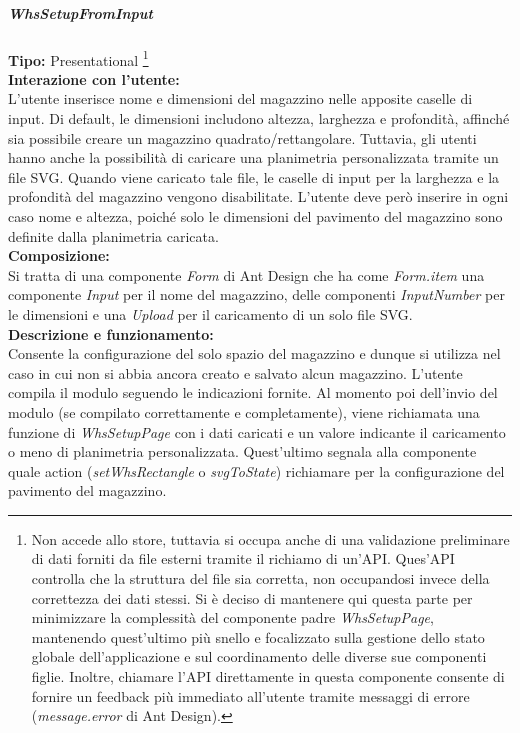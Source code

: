 \subparagraph{\colorbox{verde_uml}{WhsSetupFromInput}}
\textbf{Tipo:} Presentational \footnote[1]{\label{footnoteApi}Non accede allo store, tuttavia si occupa anche di una validazione preliminare di dati forniti da file esterni tramite il richiamo di un'API. Ques'API controlla che la struttura del file sia corretta, non occupandosi invece della correttezza dei dati stessi. Si è deciso di mantenere qui questa parte per minimizzare la complessità del componente padre \textit{WhsSetupPage}, mantenendo quest'ultimo più snello e focalizzato sulla gestione dello stato globale dell'applicazione e sul coordinamento delle diverse sue componenti figlie. Inoltre, chiamare l'API direttamente in questa componente consente di fornire un feedback più immediato all'utente tramite messaggi di errore (\textit{message.error} di Ant Design).} \\
\textbf{Interazione con l'utente:} \\
L'utente inserisce nome e dimensioni del magazzino nelle apposite caselle di input. Di default, le dimensioni includono altezza, larghezza e profondità, affinché sia possibile creare un magazzino quadrato/rettangolare. Tuttavia, gli utenti hanno anche la possibilità di caricare una planimetria personalizzata tramite un file SVG. Quando viene caricato tale file, le caselle di input per la larghezza e la profondità del magazzino vengono disabilitate. L'utente deve però inserire in ogni caso nome e altezza, poiché solo le dimensioni del pavimento del magazzino sono definite dalla planimetria caricata.  \\
\textbf{Composizione:} \\
Si tratta di una componente \textit{Form} di Ant Design che ha come \textit{Form.item} una componente \textit{Input} per il nome del magazzino, delle componenti \textit{InputNumber} per le dimensioni e una \textit{Upload} per il caricamento di un solo file SVG. \\
\textbf{Descrizione e funzionamento:} \\
Consente la configurazione del solo spazio del magazzino e dunque si utilizza nel caso in cui non si abbia ancora creato e salvato alcun magazzino.
L'utente compila il modulo seguendo le indicazioni fornite. Al momento poi dell'invio del modulo (se compilato correttamente e completamente), viene richiamata una funzione di \textit{WhsSetupPage} con i dati caricati e un valore indicante il caricamento o meno di planimetria personalizzata. Quest'ultimo segnala alla componente quale action (\textit{setWhsRectangle} o \textit{svgToState}) richiamare per la configurazione del pavimento del magazzino. 


